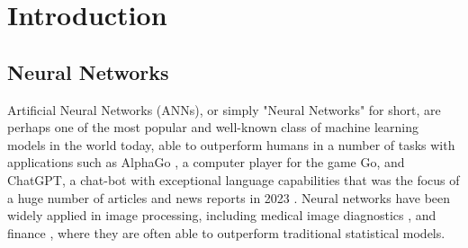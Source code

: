 \documentclass{somasmsc}
\begin{document}
\newcommand{\yourtitle}{Small Neural Networks with Interesting Architectures}
\newcommand{\yourname}{Reg. 210138711}


\pagestyle{empty}
\frontmatter
\maketitle
\pagestyle{plain}
\tableofcontents
\newpage



\setlength{\headheight}{16pt}
\fancyhead{}
\fancyfoot{}
\pagestyle{fancy}
\fancyhead[RO,LE]{\thepage}
\fancyhead[LO,RE]{\rightmark}

\newcommand{\studentcomment}[1]{\todo[inline, backgroundcolor=blue!30]{\textsc{\yourname:} #1}}
\newcommand{\DSWcomment}[1]{\todo[inline, backgroundcolor=green!30]{\textsc{DSW:} #1}}
\newcommand{\supcomment}[1]{\todo[inline, backgroundcolor=red!30]{\textsc{Supervisor:} #1}}

\mainmatter



\chapter{Introduction}\label{intro}

\section{Neural Networks}

Artificial Neural Networks (ANNs), or simply "Neural Networks" for short, are perhaps one of the most popular and well-known class of machine learning models in the world today, able to outperform humans in a number of tasks with applications such as AlphaGo \citep{silver2016mastering}, a computer player for the game Go, and ChatGPT, a chat-bot with exceptional language capabilities that was the focus of a huge number of articles and news reports in 2023 \citep{ray2023chatgpt}. Neural networks have been widely applied in image processing, including medical image diagnostics \citep{jiang2010medical}, and finance \citep{fadlalla2001analysis}, where they are often able to outperform traditional statistical models.
\end{document}
